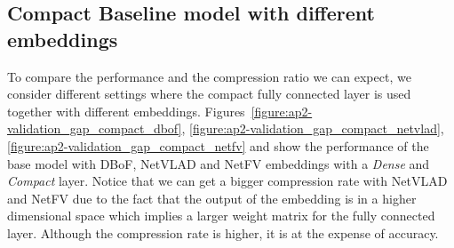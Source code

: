 \subsection{Compact Baseline model with different embeddings}
\label{subsection:ap2-compact_baseline_model_with_different_embeddings}

To compare the performance and the compression ratio we can expect, we consider different settings where the compact fully connected layer is used together with different embeddings.
 Figures~\ref{figure:ap2-validation_gap_compact_dbof}, \ref{figure:ap2-validation_gap_compact_netvlad}, \ref{figure:ap2-validation_gap_compact_netfv} and  show the performance of the base model with DBoF, NetVLAD and NetFV embeddings with a \emph{Dense} and \emph{Compact} layer.
Notice that we can get a bigger compression rate with NetVLAD and NetFV due to the fact that the output of the embedding is in a higher dimensional space which implies a larger weight matrix for the fully connected layer.
Although the compression rate is higher, it is at the expense of accuracy.



%   


